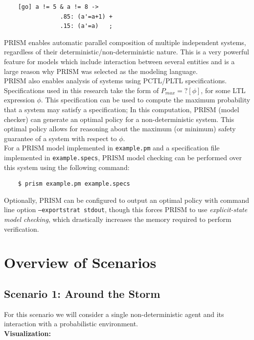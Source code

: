 \documentclass{article}
\begin{document}
\begin{verbatim}
    [go] a != 5 & a != 8 -> 
                .85: (a'=a+1) + 
                .15: (a'=a)   ;
\end{verbatim}

PRISM enables automatic parallel composition of multiple independent systems, regardless of their deterministic/non-deterministic nature. This is a very powerful feature for models which include interaction between several entities and is a large reason why PRISM was selected as the modeling language. \\

PRISM also enables analysis of systems using PCTL/PLTL specifications. Specifications used in this research take the form of $P_{max}=?[\phi]$, for some LTL expression $\phi$. This specification can be used to compute the maximum probability that a system may satisfy a specification; In this computation, PRISM (model checker) can generate an optimal policy for a non-deterministic system. This optimal policy allows for reasoning about the maximum (or minimum) safety guarantee of a system with respect to $\phi$. \\

For a PRISM model implemented in \texttt{example.pm} and a specification file implemented in \texttt{example.specs}, PRISM model checking can be performed over this system using the following command:
\begin{verbatim}
    $ prism example.pm example.specs
\end{verbatim}

Optionally, PRISM can be configured to output an optimal policy with command line option \texttt{--exportstrat stdout}, though this forces PRISM to use \textit{explicit-state model checking}, which drastically increases the memory required to perform verification.

\newpage
\section{Overview of Scenarios}
\subsection*{Scenario 1: Around the Storm}

For this scenario we will consider a single non-deterministic agent and its interaction with a probabilistic environment. \\

\textbf{Visualization:}
\end{document}
